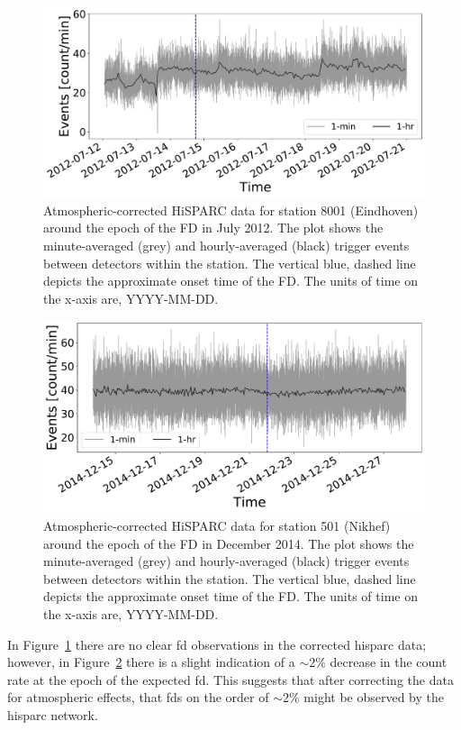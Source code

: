 \begin{figure}[ht!]
	\centering
	\includegraphics[width=0.65\columnwidth]{FD_201207_8001_CORR.pdf}
	\caption{Atmospheric-corrected HiSPARC data for station 8001 (Eindhoven) around the epoch of the FD in July 2012. The plot shows the minute-averaged (grey) and hourly-averaged (black) trigger events between detectors within the station. The vertical blue, dashed line depicts the approximate onset time of the FD. The units of time on the x-axis are, YYYY-MM-DD.}
	\label{fig:FD_201207_8001_Pcorr}
\end{figure}
%
\begin{figure}[ht!]
	\centering
	\includegraphics[width=0.65\columnwidth]{FD_201412_501_CORR.pdf}
	\caption{Atmospheric-corrected HiSPARC data for station 501 (Nikhef) around the epoch of the FD in December 2014. The plot shows the minute-averaged (grey) and hourly-averaged (black) trigger events between detectors within the station. The vertical blue, dashed line depicts the approximate onset time of the FD. The units of time on the x-axis are, YYYY-MM-DD.}
	\label{fig:FD_201412_501_Pcorr}
\end{figure}


In Figure~\ref{fig:FD_201207_8001_Pcorr} there are no clear \gls{fd} observations in the corrected \gls{hisparc} data; however, in Figure~\ref{fig:FD_201412_501_Pcorr} there is a slight indication of a $\sim2\%$ decrease in the count rate at the epoch of the expected \gls{fd}. This suggests that after correcting the data for atmospheric effects, that \glspl{fd} on the order of $\sim 2\%$ might be observed by the \gls{hisparc} network.


